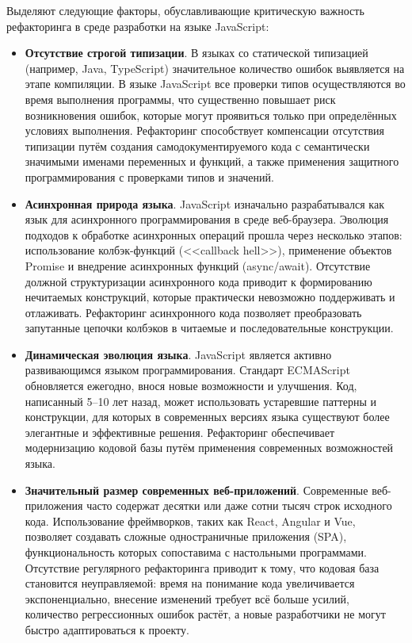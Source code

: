 Выделяют следующие факторы, обуславливающие критическую важность рефакторинга в среде разработки на языке JavaScript:
\begin{itemize}
\item \textbf{Отсутствие строгой типизации}. В языках со статической типизацией (например, Java, TypeScript) значительное количество ошибок выявляется на этапе компиляции. В языке JavaScript все проверки типов осуществляются во время выполнения программы, что существенно повышает риск возникновения ошибок, которые могут проявиться только при определённых условиях выполнения. Рефакторинг способствует компенсации отсутствия типизации путём создания самодокументируемого кода с семантически значимыми именами переменных и функций, а также применения защитного программирования с проверками типов и значений.
\item \textbf{Асинхронная природа языка}. JavaScript изначально разрабатывался как язык для асинхронного программирования в среде веб-браузера. Эволюция подходов к обработке асинхронных операций прошла через несколько этапов: использование колбэк-функций (<<callback hell>>), применение объектов Promise и внедрение асинхронных функций (async/await). Отсутствие должной структуризации асинхронного кода приводит к формированию нечитаемых конструкций, которые практически невозможно поддерживать и отлаживать. Рефакторинг асинхронного кода позволяет преобразовать запутанные цепочки колбэков в читаемые и последовательные конструкции.

\item \textbf{Динамическая эволюция языка}. JavaScript является активно развивающимся языком программирования. Стандарт ECMAScript обновляется ежегодно, внося новые возможности и улучшения. Код, написанный 5--10 лет назад, может использовать устаревшие паттерны и конструкции, для которых в современных версиях языка существуют более элегантные и эффективные решения. Рефакторинг обеспечивает модернизацию кодовой базы путём применения современных возможностей языка.
 
\item \textbf{Значительный размер современных веб-приложений}. Современные веб-приложения часто содержат десятки или даже сотни тысяч строк исходного кода. Использование фреймворков, таких как React, Angular и Vue, позволяет создавать сложные одностраничные приложения (SPA), функциональность которых сопоставима с настольными программами. Отсутствие регулярного рефакторинга приводит к тому, что кодовая база становится неуправляемой: время на понимание кода увеличивается экспоненциально, внесение изменений требует всё больше усилий, количество регрессионных ошибок растёт, а новые разработчики не могут быстро адаптироваться к проекту.
\end{itemize}